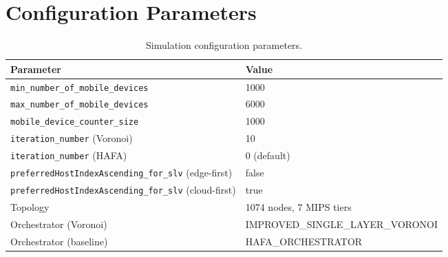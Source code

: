 \documentclass[10pt,conference]{IEEEtran}
\begin{document}
\section{Configuration Parameters}\label{app:config}
\begin{table}[!t]
\centering
\caption{Simulation configuration parameters.}
\label{tab:config}
\begin{tabular}{ll}
\toprule
\textbf{Parameter} & \textbf{Value} \\
\midrule
\texttt{min\_number\_of\_mobile\_devices} & 1000 \\
\texttt{max\_number\_of\_mobile\_devices} & 6000 \\
\texttt{mobile\_device\_counter\_size} & 1000 \\
\texttt{iteration\_number} (Voronoi) & 10 \\
\texttt{iteration\_number} (HAFA) & 0 (default) \\
\texttt{preferredHostIndexAscending\_for\_slv} (edge-first) & false \\
\texttt{preferredHostIndexAscending\_for\_slv} (cloud-first) & true \\
Topology & 1074 nodes, 7 MIPS tiers \\
Orchestrator (Voronoi) & IMPROVED\_SINGLE\_LAYER\_VORONOI \\
Orchestrator (baseline) & HAFA\_ORCHESTRATOR \\
\bottomrule
\end{tabular}
\end{table}
\end{document}

